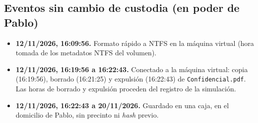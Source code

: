 \documentclass[11pt,a4paper]{article}
\begin{document}
\subsection*{Eventos sin cambio de custodia (en poder de Pablo)}

\begin{itemize}[leftmargin=1.5em,itemsep=0.4em]
  \item \textbf{12/11/2026, 16:09:56.} Formato rápido a NTFS en la máquina
        virtual (hora tomada de los metadatos NTFS del volumen).
  \item \textbf{12/11/2026, 16:19:56 a 16:22:43.} Conectado a la máquina virtual:
        copia (16:19:56), borrado (16:21:25) y expulsión (16:22:43) de
        \texttt{Confidencial.pdf}. Las horas de borrado y expulsión proceden del
        registro de la simulación.
  \item \textbf{12/11/2026, 16:22:43 a 20/11/2026.} Guardado en una caja, en el
        domicilio de Pablo, sin precinto ni \textit{hash} previo.
\end{itemize}
\end{document}
